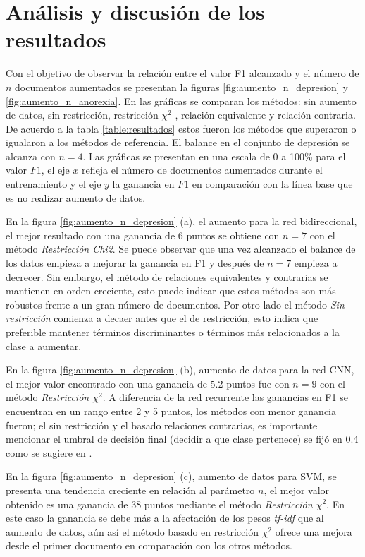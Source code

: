 \section{Análisis y discusión de los resultados}

Con el objetivo de observar la relación entre el valor F1 alcanzado y el número de $n$ documentos aumentados 
se presentan la figuras \ref{fig:aumento_n_depresion} y \ref{fig:aumento_n_anorexia}. En las gráficas se comparan los métodos: sin aumento de datos, sin restricción, restricción $\chi^2$ , relación equivalente y relación contraria. De acuerdo a la tabla \ref{table:resultados} estos fueron los métodos que superaron o igualaron a los métodos de referencia. El balance en el conjunto de depresión se alcanza con $n=4$. Las gráficas 
se presentan en una escala de 0 a 100\% para el valor $F1$, el eje $x$ refleja el número de documentos aumentados durante el entrenamiento y el eje $y$ la ganancia en $F1$ en comparación con la línea base que es no realizar aumento de datos. 

En la figura \ref{fig:aumento_n_depresion} (a), el aumento para la red bidireccional, el mejor resultado con una ganancia de 6 puntos se obtiene con $n=7$ con el método \textit{Restricción Chi2}. Se puede observar que una vez alcanzado el balance de los datos empieza a mejorar la ganancia en F1 y después de $n=7$ empieza a decrecer. Sin embargo, el método de relaciones equivalentes y contrarias se mantienen en orden creciente, esto puede indicar que estos métodos son más robustos frente a un gran número de documentos. Por otro lado el método \textit{Sin restricción} comienza a decaer antes que el de restricción, esto indica que preferible mantener términos discriminantes o términos más relacionados a la clase a aumentar.

En la figura \ref{fig:aumento_n_depresion} (b), aumento de datos para la red CNN, el mejor valor encontrado con una ganancia de 5.2 puntos fue con $n=9$ con el método \textit{Restricción $\chi^2$}. A diferencia de la red recurrente las ganancias en F1 se encuentran en un rango entre 2 y 5 puntos, los métodos con menor ganancia fueron; el sin restricción y el basado relaciones contrarias, es importante mencionar el umbral de decisión final (decidir a que clase pertenece) se fijó en 0.4 como se sugiere en \cite{trotzek2018word}. 

En la figura \ref{fig:aumento_n_depresion} (c), aumento de datos para SVM, se presenta una tendencia creciente en relación al parámetro $n$, el mejor valor obtenido es una ganancia de 38 puntos mediante el método \textit{Restricción $\chi^2$}. En este caso la ganancia se debe más a la afectación de los pesos \textit{tf-idf} que al aumento de datos, aún así el método basado en restricción $\chi^2$ ofrece una mejora desde el primer documento en comparación con los otros métodos.


